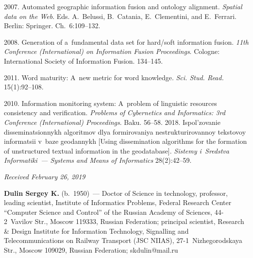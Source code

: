 \begin{multicols}{2}
{{\begin{thebibliography}{99}
 2007. Automated geographic information 
fusion and ontology alignment. \textit{Spatial data on the Web}. Eds. A.~Belussi, 
B.~Catania, E.~Clementini, and E.~Ferrari.
Berlin: Springer. Ch.~6:109--132. 

 2008. Generation of a~fundamental data set for hard/soft information 
fusion. \textit{11th Conference (International) on Information Fusion Proceedings}. 
Cologne: International Society of Information Fusion. 134--145.





 2011. Word maturity: A~new 
metric for word knowledge. \textit{Sci. Stud. Read.} 15(1):92--108. 

 2010. Information monitoring system: 
A~problem 
of linguistic resources consistency and verification. \textit{Problems of Cybernetics and 
Informatics: 3rd Conference (International) Proceedings}. Baku.  
56--58.
 2018. Ispol'zovanie disseminatsionnykh 
algoritmov dlya formirovaniya nestrukturirovannoy tekstovoy informatsii v~baze 
geodannykh [Using dissemination algorithms for the formation of unstructured textual 
information in the geodatabase]. \textit{Sistemy i~Sredstva Informatiki~--- Systems and 
Means of Informatics} 28(2):42--59.

\end{thebibliography}}}

\end{multicols}

\vspace*{-6pt}

\hfill{\small\textit{Received February 26, 2019}}

\vspace*{-16pt}

\Contr


\noindent
\textbf{Dulin Sergey K.} (b.\ 1950)~--- Doctor of Science in technology, 
professor, leading scientist, Institute of Informatics Problems, Federal Research 
Center ``Computer Science and Control'' of the Russian Academy of Sciences,  
44-2~Vavilov Str., Moscow 119333, Russian Federation; principal scientist, 
Research \& Design Institute for Information Technology, Signalling and 
Telecommunications on Railway Transport (JSC NIIAS), 27-1~Nizhegorodskaya 
Str., Moscow 109029, Russian Federation; \mbox{skdulin@mail.ru} 

